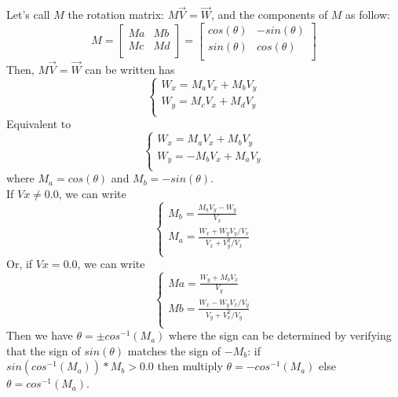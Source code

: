 \documentclass[12pt, a4paper]{article}
\begin{document}
Let's call $M$ the rotation matrix: $M\vec{V}=\vec{W}$, and the components of $M$ as follow:
\begin{equation}
M=\left[
\begin{array}{cc}
Ma&Mb\\
Mc&Md\\
\end{array}
\right]=\left[
\begin{array}{cc}
cos(\theta)&-sin(\theta)\\
sin(\theta)&cos(\theta)\\
\end{array}
\right]
\end{equation}
Then, $M\vec{V}=\vec{W}$ can be written has 
\begin{equation}
\left\lbrace
\begin{array}{l}
W_x = M_aV_x+M_bV_y\\
W_y = M_cV_x+M_dV_y\\
\end{array}
\right.
\end{equation}
Equivalent to
\begin{equation}
\left\lbrace
\begin{array}{l}
W_x = M_aV_x+M_bV_y\\
W_y = -M_bV_x+M_aV_y\\
\end{array}
\right.
\end{equation}
where $M_a=cos(\theta)$ and $M_b=-sin(\theta)$.\\
If $Vx\neq0.0$, we can write
\begin{equation}
\left\lbrace
\begin{array}{l}
M_b = \frac{M_aV_y-W_y}{V_x}\\
M_a = \frac{W_x+W_yV_y/V_x}{V_x+V_y^2/V_x}\\
\end{array}
\right.
\end{equation}
Or, if $Vx=0.0$, we can write
\begin{equation}
\left\lbrace
\begin{array}{l}
Ma = \frac{W_y+M_bV_x}{V_y}\\
Mb = \frac{W_x-W_yV_x/V_y}{V_y+V_x^2/V_y}\\
\end{array}
\right.
\end{equation}
Then we have $\theta=\pm cos^{-1}(M_a)$ where the sign can be determined by verifying that the sign of $sin(\theta)$ matches the sign of $-M_b$: if $sin(cos^{-1}(M_a))*M_b > 0.0$ then multiply $\theta=-cos^{-1}(M_a)$ else $\theta=cos^{-1}(M_a)$.
\end{document}
